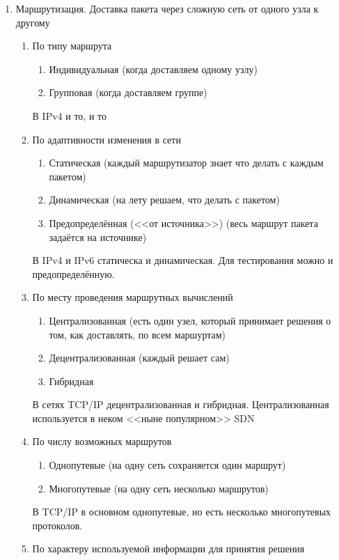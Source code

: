 \begin{enumerate}
    \item Маршрутизация. Доставка пакета через сложную сеть от одного узла к другому
    \begin{enumerate}
        \item По типу маршрута
        \begin{enumerate}
            \item Индивидуальная (когда доставляем одному узлу)
            \item Групповая (когда доставляем группе)
        \end{enumerate}
        В IPv4 и то, и то
        \item По адаптивности изменения в сети
        \begin{enumerate}
            \item Статическая (каждый маршрутизатор знает что делать с каждым пакетом)
            \item Динамическая (на лету решаем, что делать с пакетом)
            \item Предопределённая (<<от источника>>) (весь маршрут пакета задаётся на источнике)
        \end{enumerate}
        В IPv4 и IPv6 статическа и динамическая. Для тестирования можно и предопределённую.
        \item По месту проведения маршрутных вычислений
        \begin{enumerate}
            \item Централизованная (есть один узел, который принимает решения о том, как доставлять, по всем маршуртам)
            \item Децентрализованная (каждый решает сам)
            \item Гибридная
        \end{enumerate}
        В сетях TCP/IP децентрализованная и гибридная. Централизованная используется в неком <<ныне популярном>> SDN
        \item По числу возможных маршрутов
        \begin{enumerate}
            \item Однопутевые (на одну сеть сохраняется один маршрут)
            \item Многопутевые (на одну сеть несколько маршрутов)
        \end{enumerate}
        В TCP/IP в основном однопутевые, но есть несколько многопутевых протоколов.
        \item По характеру используемой информации для принятия решения
        \begin{enumerate}

\end{enumerate}
\end{enumerate}
\end{enumerate}
